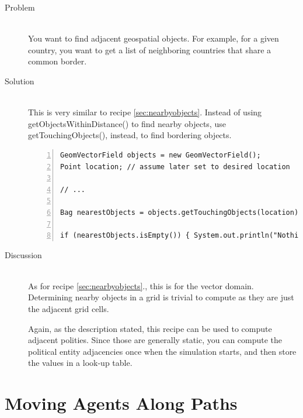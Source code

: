 \documentclass[twoside,10pt]{book}
\newcommand\method[1]{\textsf{#1}}
\begin{document}
\begin{description}
\item[Problem]~\\
You want to find adjacent geospatial objects. For example, for a given
country, you want to get a list of neighboring countries that share a
common border.

\item[Solution]~\\
This is very similar to recipe \ref{sec:nearbyobjects}.  Instead of
using \method{getObjectsWithinDistance()}  to find nearby objects, use
\method{getTouchingObjects()}, instead, to find bordering objects.
\begin{Verbatim}[frame=lines,framesep=5mm,numbers=left,commandchars=+\[\]]
GeomVectorField objects = new GeomVectorField();
Point location; // assume later set to desired location

// ...
	
Bag nearestObjects = objects.getTouchingObjects(location);

if (nearestObjects.isEmpty()) { System.out.println("Nothing nearby"); }
\end{Verbatim}

\item[Discussion]~\\
  As for recipe \ref{sec:nearbyobjects}., this is for the vector
  domain.  Determining nearby objects in a grid is trivial to compute
  as they are just the adjacent grid cells.

  Again, as the description stated, this recipe can be used to compute
  adjacent polities.  Since those are generally static, you can
  compute the political entity adjacencies once when the simulation
  starts, and then store the values in a look-up table.
\end{description}


\section{Moving Agents Along Paths}
\label{sec:movingalongpaths}
\end{document}
